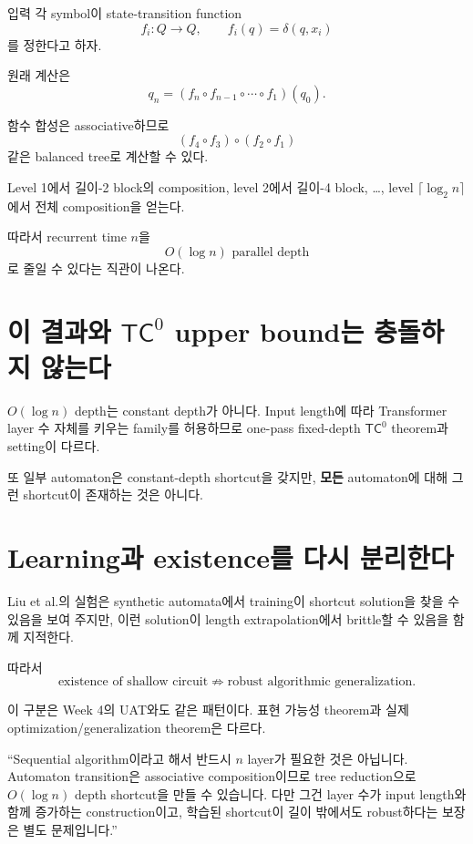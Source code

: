 \documentclass[11pt,a4paper,oneside,openany]{memoir}
\theoremstyle{definition}
\newcommand{\TC}{\mathsf{TC}}
\begin{document}
입력 각 symbol이 state-transition function
\[
f_i:Q\to Q,\qquad f_i(q)=\delta(q,x_i)
\]
를 정한다고 하자.

원래 계산은
\[
q_n=(f_n\circ f_{n-1}\circ\cdots\circ f_1)(q_0).
\]

함수 합성은 associative하므로
\[
(f_4\circ f_3)\circ(f_2\circ f_1)
\]
같은 balanced tree로 계산할 수 있다.

Level 1에서 길이-2 block의 composition,
level 2에서 길이-4 block,
\dots,
level $\lceil\log_2 n\rceil$에서 전체 composition을 얻는다.

따라서 recurrent time $n$을
\[
\boxed{O(\log n)\text{ parallel depth}}
\]
로 줄일 수 있다는 직관이 나온다.

\section{\texorpdfstring{이 결과와 $\TC^0$ upper bound는 충돌하지 않는다}{이 결과와 TC0 upper bound는 충돌하지 않는다}}

$O(\log n)$ depth는 constant depth가 아니다.
Input length에 따라 Transformer layer 수 자체를 키우는 family를 허용하므로 one-pass fixed-depth $\TC^0$ theorem과 setting이 다르다.

또 일부 automaton은 constant-depth shortcut을 갖지만, \textbf{모든} automaton에 대해 그런 shortcut이 존재하는 것은 아니다.

\section{Learning과 existence를 다시 분리한다}

Liu et al.의 실험은 synthetic automata에서 training이 shortcut solution을 찾을 수 있음을 보여 주지만,
이런 solution이 length extrapolation에서 brittle할 수 있음을 함께 지적한다.

따라서
\[
\text{existence of shallow circuit}
\not\Rightarrow
\text{robust algorithmic generalization}.
\]

이 구분은 Week 4의 UAT와도 같은 패턴이다.
표현 가능성 theorem과 실제 optimization/generalization theorem은 다르다.

\begin{presentbox}
``Sequential algorithm이라고 해서 반드시 $n$ layer가 필요한 것은 아닙니다. Automaton transition은 associative composition이므로 tree reduction으로 $O(\log n)$ depth shortcut을 만들 수 있습니다. 다만 그건 layer 수가 input length와 함께 증가하는 construction이고, 학습된 shortcut이 길이 밖에서도 robust하다는 보장은 별도 문제입니다.''
\end{presentbox}
\end{document}
